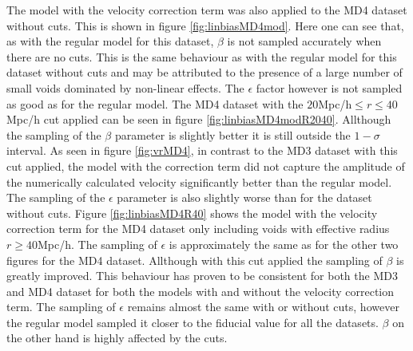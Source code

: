 The model with the velocity correction term was also applied to the MD4 dataset without cuts. This is shown in figure \ref{fig:linbiasMD4mod}. Here one can see that, as with the regular model for this dataset, $\beta$ is not sampled accurately when there are no cuts. 
This is the same behaviour as with the regular model for this dataset without cuts and may be attributed to the presence of a large number of small voids dominated by non-linear effects. The $\epsilon$ factor however is not sampled as good as for the regular model. The MD4 dataset with the $20$Mpc/h$\leq r\leq 40$Mpc/h cut applied can be seen in figure \ref{fig:linbiasMD4modR2040}. Allthough the sampling of the $\beta$ parameter is slightly better it is still outside the $1-\sigma$ interval. As seen in figure \ref{fig:vrMD4}, in contrast to the MD3 dataset with this cut applied, the model with the correction term did not capture the amplitude of the numerically calculated velocity significantly better than the regular model. The sampling of the $\epsilon$ parameter is also slightly worse than for the dataset without cuts. Figure \ref{fig:linbiasMD4R40} shows the model with the velocity correction term for the MD4 dataset only including voids with effective radius $r\geq 40$Mpc/h. The sampling of $\epsilon$ is approximately the same as for the other two figures for the MD4 dataset. Allthough with this cut applied the sampling of $\beta$ is greatly improved. This behaviour has proven to be consistent for both the MD3 and MD4 dataset for both the models with and without the velocity correction term. The sampling of $\epsilon$ remains almost the same with or without cuts, however the regular model sampled it closer to the fiducial value for all the datasets. $\beta$ on the other hand is highly affected by the cuts.

